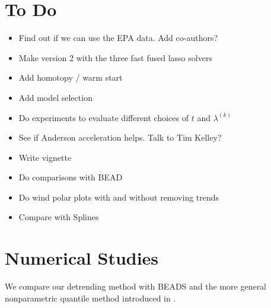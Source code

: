 \documentclass{article}
\begin{document}
\section{To Do}

\begin{itemize}
	\item Find out if we can use the EPA data. Add co-authors?
	\item Make version 2 with the three fast fused lasso solvers
	\item Add homotopy / warm start
	\item Add model selection
	\item Do experiments to evaluate different choices of $t$ and $\lambda^{(k)}$
	\item See if Anderson acceleration helps. Talk to Tim Kelley?
	\item Write vignette
	\item Do comparisons with BEAD
	\item Do wind polar plots with and without removing trends
	\item Compare with Splines
\end{itemize}

\section{Numerical Studies}

We compare our detrending method with BEADS and the more general nonparametric quantile method introduced in  \cite{Oh2011}.



\end{document}
